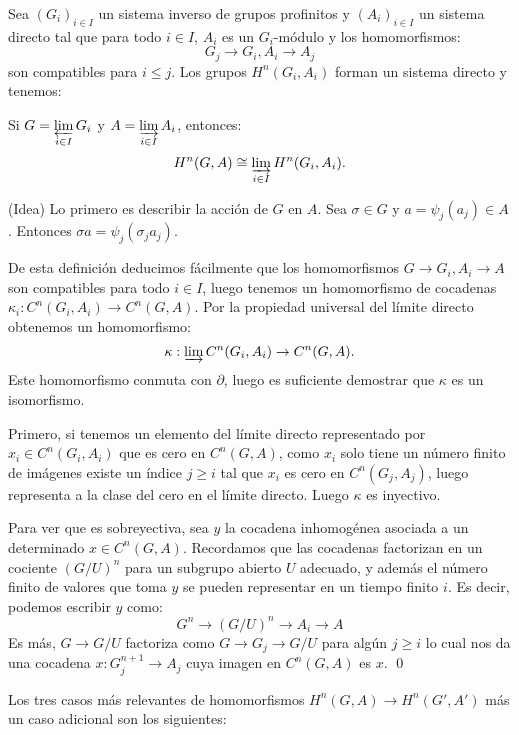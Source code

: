 \documentclass[a4paper,12pt, leqno]{article}
\begin{document}
	Sea $(G_i)_{i\in I}$ un sistema inverso de grupos profinitos y $(A_i)_{i \in I}$ un sistema directo tal que para todo $i\in I$, $A_i$ es un $G_i$-módulo y los homomorfismos:
	\begin{equation*}
	G_j \rightarrow G_i,A_i \rightarrow A_j
	\end{equation*}
	son compatibles para $i \leq j$. Los grupos $H^n(G_i,A_i)$ forman un sistema directo y tenemos:
	\begin{prop}
		Si $G=\varprojlim\limits_{i \in  I}G_i$ y $A=\varinjlim\limits_{i\in I}A_i$, entonces:
		\begin{equation*}
		H^n(G,A)\cong \varinjlim\limits_{i \in  I} H^n(G_i,A_i).
		\end{equation*}
	\end{prop}
	\begin{dem} (Idea)
	Lo primero es describir la acción de $G$ en $A$. Sea $\sigma \in G$ y $a=\psi_j(a_j)\in A$. Entonces $\sigma a=\psi_j(\sigma_j a_j)$. 
	
	De esta definición deducimos fácilmente que los homomorfismos $G \rightarrow G_i, A_i \rightarrow A$ son compatibles para todo $i\in I$, luego tenemos un homomorfismo de cocadenas $\kappa_i: C^n(G_i,A_i)\rightarrow C^n(G,A).$	Por la propiedad universal del límite directo obtenemos un homomorfismo:
	\begin{equation*}
	\kappa: \varinjlim C^n(G_i,A_i) \rightarrow C^n(G,A).
	\end{equation*}
	Este homomorfismo conmuta con $\partial$, luego es suficiente demostrar que $\kappa$ es un isomorfismo. 
	
	Primero, si tenemos un elemento del límite directo representado por $x_i \in C^n(G_i,A_i)$ que es cero en $C^n(G,A)$, como $x_i$ solo tiene un número finito de imágenes existe un índice $j\geq i$ tal que $x_i$ es cero en $C^n(G_j,A_j)$, luego representa a la clase del cero en el límite directo. Luego $\kappa$ es inyectivo.
	
	Para ver que es sobreyectiva, sea $y$ la cocadena inhomogénea asociada a un determinado $x \in C^n(G,A)$. Recordamos  que las cocadenas factorizan en un cociente $(G/U)^n$ para un subgrupo abierto $U$ adecuado, y además el número finito de valores que toma $y$ se pueden representar en un tiempo finito $i$. Es decir, podemos escribir $y$ como:
	\begin{equation*}
	G^n \rightarrow (G/U)^n \rightarrow A_i \rightarrow A
	\end{equation*}
	Es más, $G \rightarrow G/U$ factoriza como $G \rightarrow G_j \rightarrow G/U$ para algún $j \geq i$ lo cual nos da una cocadena $x:G_j^{n+1} \rightarrow A_j$ cuya imagen en $C^n(G,A)$ es $x$.	 
	\qed
	\end{dem}
	Los tres casos más relevantes de homomorfismos $H^n(G,A) \rightarrow H^n(G',A')$ más un caso adicional son los siguientes:
\end{document}
